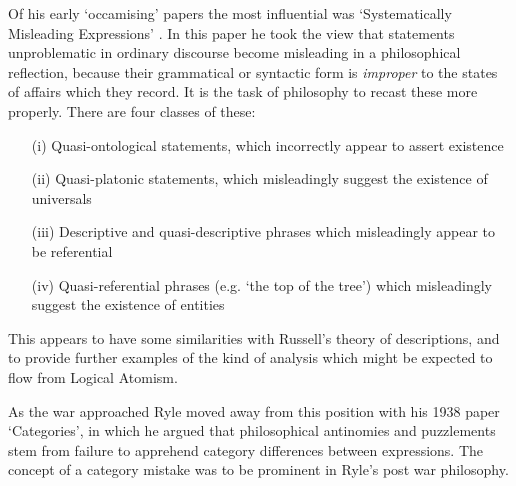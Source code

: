 Of his early `occamising' papers the most influential was `Systematically Misleading Expressions' \cite{ryleSME}.
In this paper he took the view that statements unproblematic in ordinary discourse become misleading in a philosophical reflection, because their grammatical or syntactic form is {\it improper} to the states of affairs which they record.
It is the task of philosophy to recast these more properly.
There are four classes of these:
\begin{itemize}
\item[(i)] Quasi-ontological statements, which incorrectly appear to assert existence
\item[(ii)] Quasi-platonic statements, which misleadingly suggest the existence of universals
\item[(iii)] Descriptive and quasi-descriptive phrases which misleadingly appear to be referential
\item[(iv)] Quasi-referential phrases (e.g. `the top of the tree') which misleadingly suggest the existence of entities
\end{itemize}
This appears to have some similarities with Russell's theory of descriptions, and to provide further examples of the kind of analysis which might be expected to flow from Logical Atomism.

As the war approached Ryle moved away from this position with his 1938 paper `Categories', in which he argued that philosophical antinomies and puzzlements stem from failure to apprehend category differences between expressions.
The concept of a category mistake was to be prominent in Ryle's post war philosophy.


